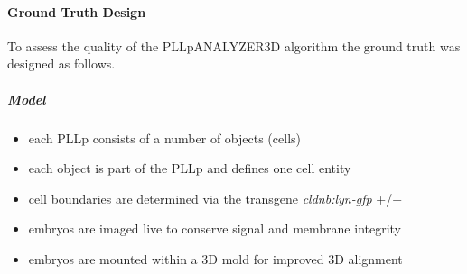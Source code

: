 \documentclass[11pt,singlespacinge,twoside]{reedthesis} %
\providecommand{\tightlist}{%
  \setlength{\itemsep}{0pt}\setlength{\parskip}{0pt}}
\begin{document}
\hypertarget{ground-truth-design-1}{%
\paragraph{Ground Truth Design}\label{ground-truth-design-1}}

To assess the quality of the PLLpANALYZER3D algorithm the ground truth was designed as follows.

\hypertarget{model-1}{%
\subparagraph{Model}\label{model-1}}
\begin{itemize}
\tightlist
\item
  each PLLp consists of a number of objects (cells)
\item
  each object is part of the PLLp and defines one cell entity
\item
  cell boundaries are determined via the transgene \emph{cldnb:lyn-gfp} +/+
\item
  embryos are imaged live to conserve signal and membrane integrity
\item
  embryos are mounted within a 3D mold for improved 3D alignment
\end{itemize}
\end{document}
